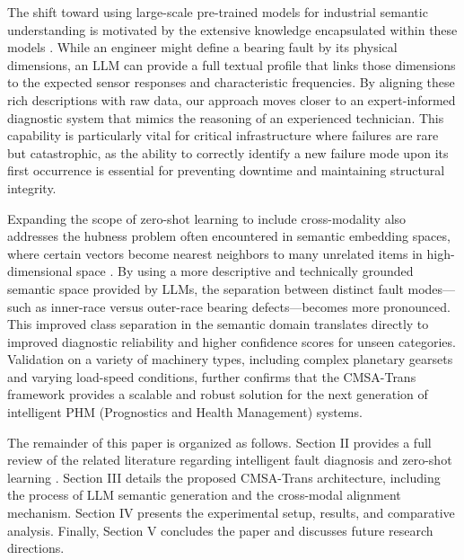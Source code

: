 The shift toward using large-scale pre-trained models for industrial semantic understanding is motivated by the extensive knowledge encapsulated within these models \cite{zhao2023brain}. While an engineer might define a bearing fault by its physical dimensions, an LLM can provide a full textual profile that links those dimensions to the expected sensor responses and characteristic frequencies. By aligning these rich descriptions with raw data, our approach moves closer to an expert-informed diagnostic system that mimics the reasoning of an experienced technician. This capability is particularly vital for critical infrastructure where failures are rare but catastrophic, as the ability to correctly identify a new failure mode upon its first occurrence is essential for preventing downtime and maintaining structural integrity.

Expanding the scope of zero-shot learning to include cross-modality also addresses the hubness problem often encountered in semantic embedding spaces, where certain vectors become nearest neighbors to many unrelated items in high-dimensional space \cite{radovanovic2010hubs}. By using a more descriptive and technically grounded semantic space provided by LLMs, the separation between distinct fault modes---such as inner-race versus outer-race bearing defects---becomes more pronounced. This improved class separation in the semantic domain translates directly to improved diagnostic reliability and higher confidence scores for unseen categories. Validation on a variety of machinery types, including complex planetary gearsets and varying load-speed conditions, further confirms that the CMSA-Trans framework provides a scalable and robust solution for the next generation of intelligent PHM (Prognostics and Health Management) systems.

The remainder of this paper is organized as follows. Section II provides a full review of the related literature regarding intelligent fault diagnosis and zero-shot learning \cite{li2022zero}. Section III details the proposed CMSA-Trans architecture, including the process of LLM semantic generation and the cross-modal alignment mechanism. Section IV presents the experimental setup, results, and comparative analysis. Finally, Section V concludes the paper and discusses future research directions.
